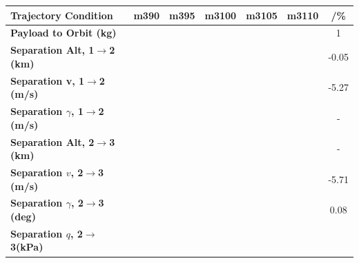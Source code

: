 \begin{table}[ht]
	\centering
	\begin{tabular}{l c c c c c c} 
		\hline \textbf{Trajectory Condition}
		&m390
		&m395
		&m3100
		&m3105
		&m3110
		& /\%
		\\
		\hline \textbf{Payload to Orbit (kg)}
		& \PayloadToOrbitmThreeNinety
		& \PayloadToOrbitmThreeNinetyFive
		& \PayloadToOrbitmThreeStandard
		& \PayloadToOrbitmThreeOneHundredFive
		& \PayloadToOrbitmThreeOneHundredTen
		&1
		\\
		\textbf{Separation Alt, 1$\rightarrow$2 (km)}
		& \firstsecondSeparationAltmThreeNinety
		& \firstsecondSeparationAltmThreeNinetyFive
		& \firstsecondSeparationAltmThreeStandard
		& \firstsecondSeparationAltmThreeOneHundredFive
		& \firstsecondSeparationAltmThreeOneHundredTen
		&-0.05
		\\
		\textbf{Separation v, 1$\rightarrow$2 (m/s)}
		& \firstsecondSeparationvmThreeNinety
		& \firstsecondSeparationvmThreeNinetyFive
		& \firstsecondSeparationvmThreeStandard
		& \firstsecondSeparationvmThreeOneHundredFive
		& \firstsecondSeparationvmThreeOneHundredTen
		&-5.27
		\\
		\textbf{Separation $\gamma$, 1$\rightarrow$2 (m/s)}
		& \firstsecondSeparationgammamThreeNinety
		& \firstsecondSeparationgammamThreeNinetyFive
		& \firstsecondSeparationgammamThreeStandard
		& \firstsecondSeparationgammamThreeOneHundredFive
		& \firstsecondSeparationgammamThreeOneHundredTen
		& -
		\\
		\textbf{Separation Alt, 2$\rightarrow$3 (km)}
		& \secondthirdSeparationAltmThreeNinety
		& \secondthirdSeparationAltmThreeNinetyFive
		& \secondthirdSeparationAltmThreeStandard
		& \secondthirdSeparationAltmThreeOneHundredFive
		& \secondthirdSeparationAltmThreeOneHundredTen
		& -
		\\
		\textbf{Separation $v$, 2$\rightarrow$3 (m/s)}
		& \secondthirdSeparationvmThreeNinety
		& \secondthirdSeparationvmThreeNinetyFive
		& \secondthirdSeparationvmThreeStandard
		& \secondthirdSeparationvmThreeOneHundredFive
		& \secondthirdSeparationvmThreeOneHundredTen
		&-5.71
		\\
		\textbf{Separation $\gamma$, 2$\rightarrow$3 (deg)}
		& \secondthirdSeparationgammamThreeNinety
		& \secondthirdSeparationgammamThreeNinetyFive
		& \secondthirdSeparationgammamThreeStandard
		& \secondthirdSeparationgammamThreeOneHundredFive
		& \secondthirdSeparationgammamThreeOneHundredTen
		&0.08
		\\
		\textbf{Separation $q$, 2$\rightarrow$3(kPa)}

\end{tabular}
\end{table}
